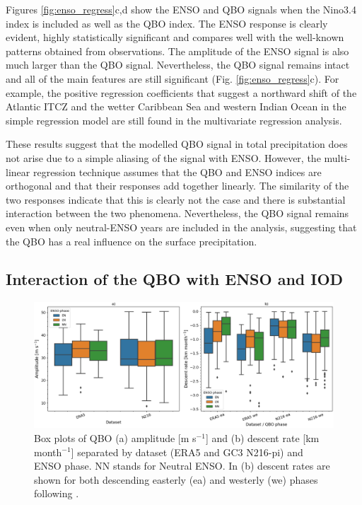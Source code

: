 Figures  \ref{fig:enso_regress}c,d show the ENSO and QBO signals when the Nino3.4 index is included as well as the QBO index.  The ENSO response is clearly evident, highly statistically significant and compares well with the well-known patterns obtained from observations. The amplitude of the ENSO signal is also much larger than the QBO signal. Nevertheless, the QBO signal remains intact and all of the main features are still significant (Fig.  \ref{fig:enso_regress}c). For example, the positive regression coefficients that suggest a northward shift of the Atlantic ITCZ and the wetter Caribbean Sea and western Indian Ocean in the simple regression model are still found in the multivariate regression analysis.  

 
These results suggest that the modelled QBO signal in total precipitation does not arise due to a simple aliasing of the signal with ENSO. However, the multi-linear regression technique assumes that the QBO and ENSO indices are orthogonal and that their responses add together linearly. The similarity of the two responses indicate that this is clearly not the case and there is substantial interaction between the two phenomena. Nevertheless, the QBO signal remains even when only neutral-ENSO years are included in the analysis, suggesting that the QBO has a real influence on the surface precipitation.

\subsection{Interaction of the QBO with ENSO and IOD}
\label{sq:iod_enso}

\begin{figure}[t!]
\centering
 \noindent
 \includegraphics[width=\linewidth]{figures/scatter_qbom.png}
\caption[Scatter of relationship between QBO descent and amplitude and ENSO phase.]{Box plots of QBO (a) amplitude [m s$^{-1}$]  and (b) descent rate [km month$^{-1}$]  separated by dataset (ERA5 and GC3 N216-pi) and ENSO phase. NN stands for Neutral ENSO. In (b) descent rates are shown for both descending easterly (ea) and westerly (we) phases following \cite{schenzinger2017}. }
\label{fig:enso_on_qbo}
\end{figure}

